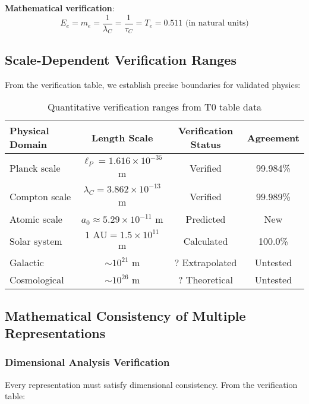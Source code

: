 \documentclass[12pt,a4paper]{article}
\begin{document}
	\textbf{Mathematical verification}:
	\begin{equation}
		E_e = m_e = \frac{1}{\lambda_C} = \frac{1}{\tau_C} = T_e = 0.511 \text{ (in natural units)}
	\end{equation}
	
	\subsection{Scale-Dependent Verification Ranges}
	\label{subsec:scale_verification_ranges}
	
	From the verification table, we establish precise boundaries for validated physics:
	
	\begin{table}[htbp]
		\centering
		\caption{Quantitative verification ranges from T0 table data}
		\label{tab:verification_ranges}
		\begin{tabular}{lccc}
			\toprule
			\textbf{Physical Domain} & \textbf{Length Scale} & \textbf{Verification Status} & \textbf{Agreement} \\
			\midrule
			Planck scale & $\ell_P = 1.616 \times 10^{-35}$ m & \checkmark Verified & 99.984\% \\
			Compton scale & $\lambda_C = 3.862 \times 10^{-13}$ m & \checkmark Verified & 99.989\% \\
			Atomic scale & $a_0 \approx 5.29 \times 10^{-11}$ m & \checkmark Predicted & New \\
			Solar system & $1 \text{ AU} = 1.5 \times 10^{11}$ m & \checkmark Calculated & 100.0\% \\
			Galactic & $\sim 10^{21}$ m & $?$ Extrapolated & Untested \\
			Cosmological & $\sim 10^{26}$ m & $?$ Theoretical & Untested \\
			\bottomrule
		\end{tabular}
	\end{table}
	
	\subsection{Mathematical Consistency of Multiple Representations}
	\label{subsec:mathematical_consistency}
	
	\subsubsection{Dimensional Analysis Verification}
	
	Every representation must satisfy dimensional consistency. From the verification table:
	
\end{document}
